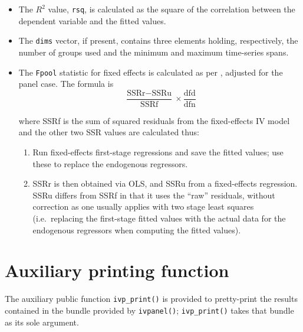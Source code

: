 \documentclass{article}
\begin{document}
\begin{itemize}

\item The $R^2$ value, \texttt{rsq}, is calculated as the square of the
  correlation between the dependent variable and the fitted values.

\item The \texttt{dims} vector, if present, contains three elements
  holding, respectively, the number of groups used and the minimum and
  maximum time-series spans.

\item The \texttt{Fpool} statistic for fixed effects is calculated as
  per \cite{wooldridge90}, adjusted for the panel case. The formula is
\[
 \frac{\mbox{SSRr} - \mbox{SSRu}}{\mbox{SSRf}} \times 
  \frac{\mbox{dfd}}{\mbox{dfn}}
\]

 where SSRf is the sum of squared residuals from the fixed-effects IV
 model and the other two SSR values are calculated thus:
\begin{enumerate}
\item Run fixed-effects first-stage regressions and save the fitted
values; use these to replace the endogenous regressors.

\item SSRr is then obtained via OLS, and SSRu from a fixed-effects 
regression. SSRu differs from SSRf in that it uses the ``raw''
residuals, without correction as one usually applies with two 
stage least squares (i.e.\ replacing the first-stage fitted 
values with the actual data for the endogenous regressors 
when computing the fitted values).
\end{enumerate}

\end{itemize}

\section{Auxiliary printing function}

The auxiliary public function \texttt{ivp\_print()} is provided to
pretty-print the results contained in the bundle provided by
\texttt{ivpanel()}; \texttt{ivp\_print()} takes that bundle as its
sole argument.



\end{document}
